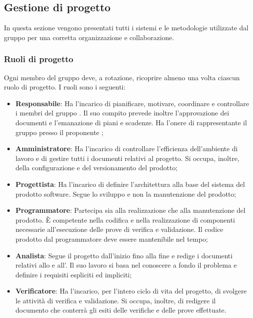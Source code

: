 \subsection{Gestione di progetto}
In questa sezione vengono presentati tutti i sistemi e le metodologie utilizzate dal gruppo per una corretta organizzazione e collaborazione.
\subsubsection{Ruoli di progetto}
Ogni membro del gruppo deve, a rotazione, ricoprire almeno una volta ciascun ruolo di progetto.
I ruoli sono i seguenti:
\begin{itemize}
\item \textbf{Responsabile}: Ha l'incarico di pianificare, motivare, coordinare e controllare i membri del gruppo \Gruppo{}.
Il suo compito prevede inoltre l'approvazione dei documenti e l'emanazione di piani e scadenze.
Ha l'onere di rappresentante il gruppo presso il proponente \Proponente{};
\item \textbf{Amministratore}: Ha l'incarico di controllare l'efficienza dell'ambiente di lavoro e di gestire tutti i documenti relativi al progetto.
Si occupa, inoltre, della configurazione e del versionamento del prodotto;
\item \textbf{Progettista}: Ha l'incarico di definire l'architettura alla base del sistema del prodotto software.
Segue lo sviluppo e non la manutenzione del prodotto;
\item \textbf{Programmatore}: Partecipa sia alla realizzazione che alla manutenzione del prodotto.
È competente nella codifica e nella realizzazione di componenti necessarie all’esecuzione delle prove di verifica e validazione.
Il codice prodotto dal programmatore deve essere mantenibile nel tempo;
\item \textbf{Analista}: Segue il progetto dall'inizio fino alla fine e redige i documenti relativi allo \SdF{} e all'\AdR{}.
Il suo lavoro si basa nel conoscere a fondo il problema e definire i requisiti espliciti ed impliciti;
\item \textbf{Verificatore}: Ha l'incarico, per l'intero ciclo di vita del progetto, di svolgere le attività di verifica e validazione.
Si occupa, inoltre, di redigere il documento \PdQ{} che conterrà gli esiti delle verifiche e delle prove effettuate.
\end{itemize}

